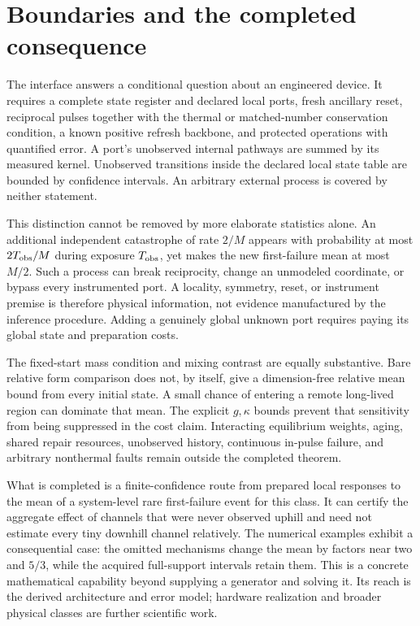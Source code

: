 \documentclass[10pt,a4paper]{article}
\theoremstyle{definition}\newtheorem{assumption}[theorem]{Assumption}
\begin{document}
\section{Boundaries and the completed consequence}

The interface answers a conditional question about an engineered device. It requires a complete state register and declared local ports, fresh ancillary reset, reciprocal pulses together with the thermal or matched-number conservation condition, a known positive refresh backbone, and protected operations with quantified error. A port's unobserved internal pathways are summed by its measured kernel. Unobserved transitions inside the declared local state table are bounded by confidence intervals. An arbitrary external process is covered by neither statement.

This distinction cannot be removed by more elaborate statistics alone. An additional independent catastrophe of rate $2/M$ appears with probability at most $2T_{\rm obs}/M$ during exposure $T_{\rm obs}$, yet makes the new first-failure mean at most $M/2$. Such a process can break reciprocity, change an unmodeled coordinate, or bypass every instrumented port. A locality, symmetry, reset, or instrument premise is therefore physical information, not evidence manufactured by the inference procedure. Adding a genuinely global unknown port requires paying its global state and preparation costs.

The fixed-start mass condition and mixing contrast are equally substantive. Bare relative form comparison does not, by itself, give a dimension-free relative mean bound from every initial state. A small chance of entering a remote long-lived region can dominate that mean. The explicit $g,\kappa$ bounds prevent that sensitivity from being suppressed in the cost claim. Interacting equilibrium weights, aging, shared repair resources, unobserved history, continuous in-pulse failure, and arbitrary nonthermal faults remain outside the completed theorem.

What is completed is a finite-confidence route from prepared local responses to the mean of a system-level rare first-failure event for this class. It can certify the aggregate effect of channels that were never observed uphill and need not estimate every tiny downhill channel relatively. The numerical examples exhibit a consequential case: the omitted mechanisms change the mean by factors near two and $5/3$, while the acquired full-support intervals retain them. This is a concrete mathematical capability beyond supplying a generator and solving it. Its reach is the derived architecture and error model; hardware realization and broader physical classes are further scientific work.
\end{document}
